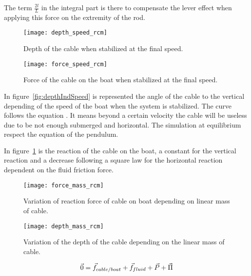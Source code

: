 The term $\frac{2 l}{L}$ in the integral part is there to compensate the lever effect when applying this force on the extremity of the rod.



\begin{figure}[H]
\centering
    \begin{minipage}[b]{0.4\textwidth}
    \centering
    \texttt{[image: depth\_speed\_rcm]}
    \caption{Depth of the cable when stabilized at the final speed.}
    \label{fig:depthIndSpeed}
    \end{minipage}
    \hfill
    \begin{minipage}[b]{0.45\textwidth}
    \centering
    \texttt{[image: force\_speed\_rcm]}
    \caption{Force of the cable on the boat when stabilized at the final speed.}
    \label{fig:forceIndSpeed}
    \end{minipage}
\end{figure}

In figure~\ref{fig:depthIndSpeed} is represented the angle of the cable to the vertical depending of the speed of the boat when the system is stabilized. The curve follows the equation \label{equ_theta_1}.
It means beyond a certain velocity the cable will be useless due to be not enough submerged and horizontal. The simulation at equilibrium respect the equation of the pendulum.

In figure~\ref{fig:forceIndSpeed} is the reaction of the cable on the boat, a constant for the vertical reaction and a decrease following a square law for the horizontal reaction dependent on the fluid friction force.


\begin{figure}[H]
\centering
    \begin{minipage}[b]{0.4\textwidth}
    \centering
    \texttt{[image: force\_mass\_rcm]}
    \caption{Variation of reaction force of cable on boat depending on linear  mass of cable.}
    \label{fig:massForce}
    \end{minipage}
    \hfill
    \begin{minipage}[b]{0.45\textwidth}
    \centering
    \texttt{[image: depth\_mass\_rcm]}
    \caption{Variation of the depth of the cable depending on the linear mass of cable.}
    \label{fig:linmassAngle}
    \end{minipage}
\end{figure}

\begin{equation}
 \vec{0} = \vec{f}_{cable/boat}+\vec{f}_{fluid}+\vec{P}+\vec{\Pi}\\
 \label{equ_Stab}
\end{equation}

